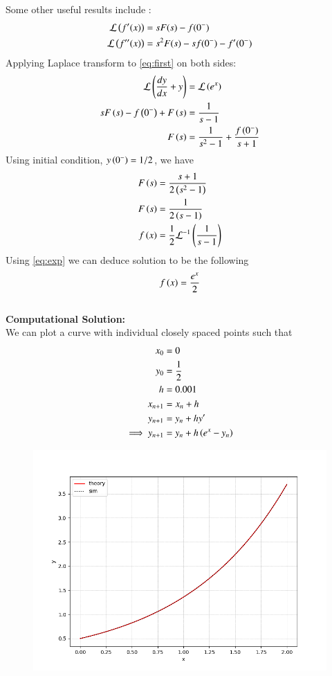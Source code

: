 \documentclass[journal,12pt,onecolumn]{IEEEtran}
\theoremstyle{remark}
\begin{document}
Some other useful results include :
		\begin{align}
			\mathcal{L} \left(f^{\prime}(x)\right) &= s F(s) - f(0^{-}) \\
			\mathcal{L} \left(f^{\prime \prime}(x)\right) &= s^2 F(s) - s f(0^{-}) - f^{\prime}(0^{-}) 
		\end{align}
Applying Laplace transform to \eqref{eq:first} on both sides:\\
\begin{align}
    \mathcal{L}\left(\frac{dy}{dx}+y\right)&=\mathcal{L}\left(e^x\right)\\
    sF\left(s\right)-f\left(0^-\right)+F\left(s\right)&=\frac{1}{s-1}\\
    F\left(s\right)&=\frac{1}{s^2-1}+\frac{f\left(0^-\right)}{s+1}
\end{align}
Using initial condition, $y\left(0^-\right)=1/2$, we have
\begin{align}
    F\left(s\right)&=\frac{s+1}{2\left(s^2-1\right)}\\
    F\left(s\right)&=\frac{1}{2\left(s-1\right)}\\
    f\left(x\right)&=\frac{1}{2}\mathcal{L}^{-1}\left(\frac{1}{s-1}\right)
\end{align}
Using \eqref{eq:exp} we can deduce solution to be the following
\begin{align}
    f\left(x\right)=\frac{e^x}{2}
\end{align}
\\
\textbf{Computational Solution:}\\
We can plot a curve with individual closely spaced points such that
\begin{align}
    x_0&=0\\
    y_0&=\frac{1}{2}\\
    h&=0.001\\
    x_{n+1}&=x_{n}+h\\
    y_{n+1}&=y_n+hy^\prime\\
    \implies y_{n+1}&=y_n+h\left(e^x-y_n\right)
\end{align}
\begin{figure}[h]
    \centering
    \includegraphics[width=\columnwidth]{figs/fig.png}
 \end{figure}
\end{document}
